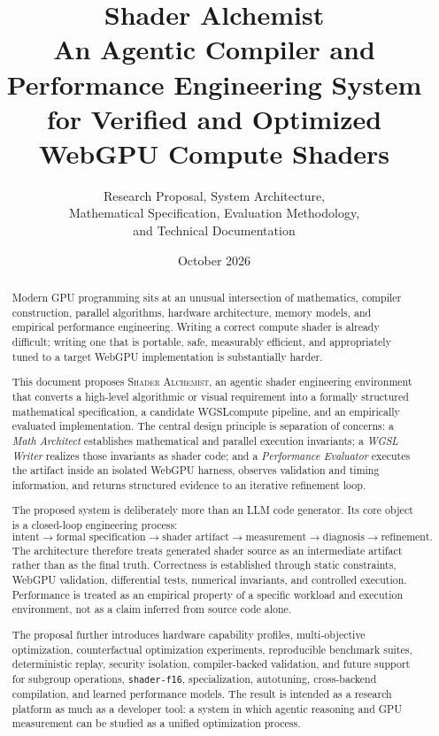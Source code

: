 \documentclass[11pt,a4paper,oneside]{report}
\title{
  \Huge\bfseries Shader Alchemist\\[0.4em]
  \Large An Agentic Compiler and Performance Engineering System\\
  for Verified and Optimized WebGPU Compute Shaders
}
\author{
  Research Proposal, System Architecture,\\
  Mathematical Specification, Evaluation Methodology,\\
  and Technical Documentation
}
\date{October 2026}
\newcommand{\SA}{\textsc{Shader Alchemist}}
\newcommand{\WGSL}{\textsc{WGSL}}
\begin{document}
\maketitle
\thispagestyle{empty}

\begin{abstract}
Modern GPU programming sits at an unusual intersection of mathematics, compiler construction,
parallel algorithms, hardware architecture, memory models, and empirical performance engineering.
Writing a correct compute shader is already difficult; writing one that is portable, safe,
measurably efficient, and appropriately tuned to a target WebGPU implementation is substantially
harder.

This document proposes \SA, an agentic shader engineering environment that converts a high-level
algorithmic or visual requirement into a formally structured mathematical specification, a
candidate \WGSL compute pipeline, and an empirically evaluated implementation. The central design
principle is separation of concerns: a \emph{Math Architect} establishes mathematical and parallel
execution invariants; a \emph{WGSL Writer} realizes those invariants as shader code; and a
\emph{Performance Evaluator} executes the artifact inside an isolated WebGPU harness, observes
validation and timing information, and returns structured evidence to an iterative refinement loop.

The proposed system is deliberately more than an LLM code generator. Its core object is a
closed-loop engineering process:
\[
\text{intent}\rightarrow\text{formal specification}\rightarrow
\text{shader artifact}\rightarrow\text{measurement}\rightarrow
\text{diagnosis}\rightarrow\text{refinement}.
\]
The architecture therefore treats generated shader source as an intermediate artifact rather
than as the final truth. Correctness is established through static constraints, WebGPU validation,
differential tests, numerical invariants, and controlled execution. Performance is treated as an
empirical property of a specific workload and execution environment, not as a claim inferred from
source code alone.

The proposal further introduces hardware capability profiles, multi-objective optimization,
counterfactual optimization experiments, reproducible benchmark suites, deterministic replay,
security isolation, compiler-backed validation, and future support for subgroup operations,
\texttt{shader-f16}, specialization, autotuning, cross-backend compilation, and learned performance
models. The result is intended as a research platform as much as a developer tool: a system in
which agentic reasoning and GPU measurement can be studied as a unified optimization process.
\end{abstract}
\end{document}
